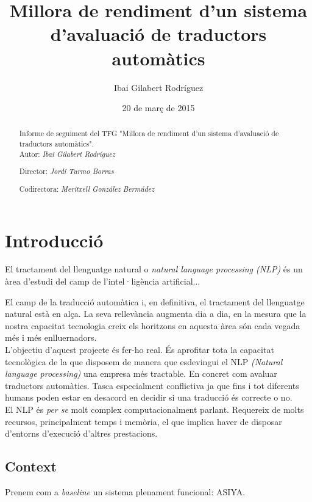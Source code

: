 \documentclass[11pt,a4paper]{article}
\begin{document}
\title{Millora de rendiment d'un sistema d'avaluació de traductors automàtics}
\author{Ibai Gilabert Rodríguez}
\date{20 de març de 2015}
\maketitle
\newpage

\begin{abstract}
Informe de seguiment del TFG "Millora de rendiment d'un sistema d'avaluació de traductors automàtics".
\\

Autor: \textit{Ibai Gilabert Rodríguez}

Director: \textit{Jordi Turmo Borras}

Codirectora: \textit{Meritxell González Bermúdez}
\end{abstract}
\newpage

\tableofcontents
\newpage

\section{Introducció}

El tractament del llenguatge natural o \textit{natural language processing (NLP)} és un àrea d'estudi del camp de l'intel·ligència artificial...


El camp de la traducció automàtica i, en definitiva, el tractament del llenguatge natural està en alça. La seva rellevància augmenta dia a dia, en la mesura que la nostra capacitat tecnologia creix els horitzons en aquesta àrea són cada vegada més i més enlluernadors.
\\

L'objectiu d'aquest projecte és fer-ho real. És aprofitar tota la capacitat tecnològica de la que disposem de manera que esdevingui el NLP \textit{(Natural language processing)} una empresa més tractable. En concret com avaluar traductors automàtics. Tasca especialment conflictiva ja que fins i tot diferents humans poden estar en desacord en decidir si una traducció és correcte o no.
\\

El NLP és \textit{per se} molt complex computacionalment parlant. Requereix de molts recursos, principalment temps i memòria, el que implica haver de disposar d'entorns d'execució d'altres prestacions.
\\

\subsection{Context}
Prenem com a \textit{baseline} un sistema plenament funcional: ASIYA\cite{asiya}.
\\
\end{document}
